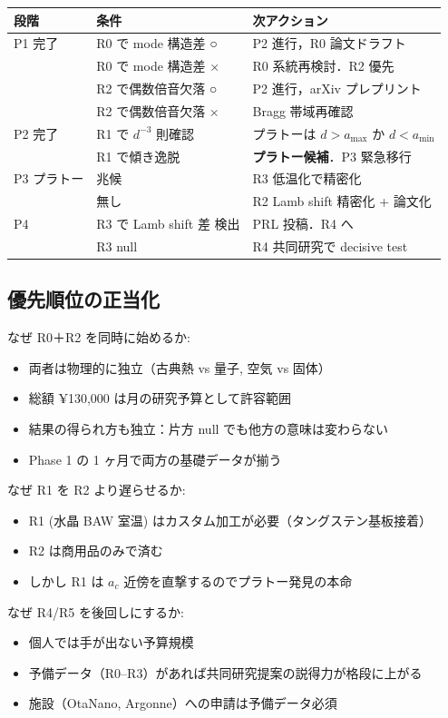 \documentclass[11pt,a4paper]{article}
\begin{document}
\begin{center}
\small
\begin{tabular}{lll}
\toprule
段階 & 条件 & 次アクション \\
\midrule
P1 完了 & R0 で mode 構造差 ○ & P2 進行，R0 論文ドラフト \\
 & R0 で mode 構造差 × & R0 系統再検討．R2 優先 \\
 & R2 で偶数倍音欠落 ○ & P2 進行，arXiv プレプリント \\
 & R2 で偶数倍音欠落 × & Bragg 帯域再確認 \\
P2 完了 & R1 で $d^{-3}$ 則確認 & プラトーは $d>a_{\max}$ か $d<a_{\min}$ \\
 & R1 で傾き逸脱 & \textbf{プラトー候補}．P3 緊急移行 \\
P3 プラトー & 兆候 & R3 低温化で精密化 \\
 & 無し & R2 Lamb shift 精密化 + 論文化 \\
P4 & R3 で Lamb shift 差 検出 & PRL 投稿．R4 へ \\
 & R3 null & R4 共同研究で decisive test \\
\bottomrule
\end{tabular}
\end{center}

\subsection{優先順位の正当化}

なぜ R0＋R2 を同時に始めるか:
\begin{itemize}
\item 両者は物理的に独立（古典熱 vs 量子, 空気 vs 固体）
\item 総額 ¥130,000 は月の研究予算として許容範囲
\item 結果の得られ方も独立：片方 null でも他方の意味は変わらない
\item Phase 1 の 1 ヶ月で両方の基礎データが揃う
\end{itemize}

なぜ R1 を R2 より遅らせるか:
\begin{itemize}
\item R1 (水晶 BAW 室温) はカスタム加工が必要（タングステン基板接着）
\item R2 は商用品のみで済む
\item しかし R1 は $a_c$ 近傍を直撃するのでプラトー発見の本命
\end{itemize}

なぜ R4/R5 を後回しにするか:
\begin{itemize}
\item 個人では手が出ない予算規模
\item 予備データ（R0--R3）があれば共同研究提案の説得力が格段に上がる
\item 施設（OtaNano, Argonne）への申請は予備データ必須
\end{itemize}
\end{document}
